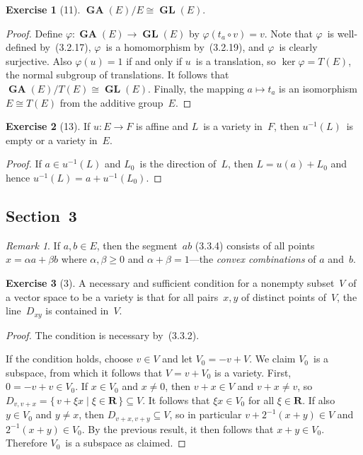 \documentclass[letterpaper,12pt]{article}
\newcommand{\R}{\mathbf{R}}
\newcommand{\iso}{\cong}
\newcommand{\after}{\circ}
\DeclareMathOperator{\GL}{\mathbf{GL}}
\DeclareMathOperator{\GA}{\mathbf{GA}}
\newcommand{\inv}[1]{#1^{-1}}
\theoremstyle{definition}
\newtheorem*{exer}{Exercise}
\theoremstyle{remark}
\newtheorem*{rmk}{Remark}
\begin{document}
\begin{exer}[11]
\(\GA(E)/E\iso\GL(E)\).
\end{exer}
\begin{proof}
Define \(\varphi:\GA(E)\to\GL(E)\) by \(\varphi(t_a\after v)=v\). Note that \(\varphi\)~is well-defined by~(3.2.17), \(\varphi\)~is a homomorphism by~(3.2.19), and \(\varphi\)~is clearly surjective. Also \(\varphi(u)=1\) if and only if \(u\)~is a translation, so \(\ker\varphi=T(E)\), the normal subgroup of translations. It follows that \(\GA(E)/T(E)\iso\GL(E)\). Finally, the mapping \(a\mapsto t_a\) is an isomorphism \(E\iso T(E)\) from the additive group~\(E\).
\end{proof}

\begin{exer}[13]
If \(u:E\to F\) is affine and \(L\)~is a variety in~\(F\), then \(\inv{u}(L)\)~is empty or a variety in~\(E\).
\end{exer}
\begin{proof}
If \(a\in\inv{u}(L)\) and \(L_0\)~is the direction of~\(L\), then \(L=u(a)+L_0\) and hence \(\inv{u}(L)=a+\inv{u}(L_0)\).
\end{proof}

\subsection*{Section~3}
\begin{rmk}
If \(a,b\in E\), then the segment~\(ab\) (3.3.4) consists of all points \(x=\alpha a+\beta b\) where \(\alpha,\beta\ge 0\) and \(\alpha+\beta=1\)---the \emph{convex combinations} of \(a\) and~\(b\).
\end{rmk}

\begin{exer}[3]
A necessary and sufficient condition for a nonempty subset~\(V\) of a vector space to be a variety is that for all pairs~\(x,y\) of distinct points of~\(V\), the line~\(D_{xy}\) is contained in~\(V\).
\end{exer}
\begin{proof}
The condition is necessary by~(3.3.2).

If the condition holds, choose \(v\in V\) and let \(V_0=-v+V\). We claim \(V_0\)~is a subspace, from which it follows that \(V=v+V_0\) is a variety. First, \(0=-v+v\in V_0\). If \(x\in V_0\) and \(x\ne 0\), then \(v+x\in V\) and \(v+x\ne v\), so \(D_{v,v+x}=\{\,v+\xi x\mid\xi\in\R\,\}\subseteq V\). It follows that \(\xi x\in V_0\) for all \(\xi\in\R\). If also \(y\in V_0\) and \(y\ne x\), then \(D_{v+x,v+y}\subseteq V\), so in particular \(v+2^{-1}(x+y)\in V\) and \(2^{-1}(x+y)\in V_0\). By the previous result, it then follows that \(x+y\in V_0\). Therefore \(V_0\)~is a subspace as claimed.
\end{proof}
\end{document}
